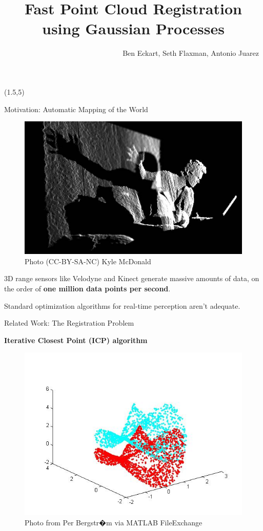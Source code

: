 \documentclass[final]{beamer}
\title{Fast Point Cloud Registration using Gaussian Processes}
\author{~~~~~~~~~~~~~~~~~~~~~~~~~~~~~~~~Ben Eckart, Seth Flaxman, Antonio Juarez}
\date{}
\begin{document}

\begin{frame}{} 

\begin{textblock}{27}(1.5,5)
\begin{block}{Motivation: Automatic Mapping of the World}
\begin{figure}
\includegraphics[width=10in]{kyle_kinect.jpg}
\caption{Photo (CC-BY-SA-NC) Kyle McDonald}
\end{figure}

3D range sensors like Velodyne and Kinect generate massive amounts of data, on the order of
{\bf one million data points per second}.

Standard optimization algorithms for real-time perception aren't adequate.

\end{block}

\begin{block}{Related Work: The Registration Problem}

{\bf Iterative Closest Point (ICP) algorithm \cite{besl_method_1992}} 
\begin{figure}
\includegraphics[width=10in]{icpCpp.jpg}
\caption{Photo from Per Bergstr�m via MATLAB FileExchange}
\end{figure}


\end{block}
\end{textblock}
\end{frame}
\end{document}
